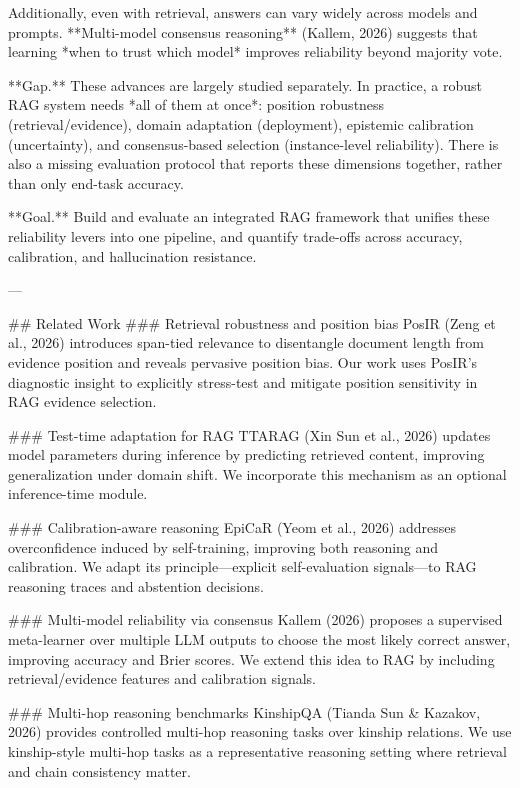Additionally, even with retrieval, answers can vary widely across models and prompts. **Multi-model consensus reasoning** (Kallem, 2026) suggests that learning *when to trust which model* improves reliability beyond majority vote.

**Gap.** These advances are largely studied separately. In practice, a robust RAG system needs *all of them at once*: position robustness (retrieval/evidence), domain adaptation (deployment), epistemic calibration (uncertainty), and consensus-based selection (instance-level reliability). There is also a missing evaluation protocol that reports these dimensions together, rather than only end-task accuracy.

**Goal.** Build and evaluate an integrated RAG framework that unifies these reliability levers into one pipeline, and quantify trade-offs across accuracy, calibration, and hallucination resistance.

---

## Related Work  
### Retrieval robustness and position bias  
PosIR (Zeng et al., 2026) introduces span-tied relevance to disentangle document length from evidence position and reveals pervasive position bias. Our work uses PosIR’s diagnostic insight to explicitly stress-test and mitigate position sensitivity in RAG evidence selection.

### Test-time adaptation for RAG  
TTARAG (Xin Sun et al., 2026) updates model parameters during inference by predicting retrieved content, improving generalization under domain shift. We incorporate this mechanism as an optional inference-time module.

### Calibration-aware reasoning  
EpiCaR (Yeom et al., 2026) addresses overconfidence induced by self-training, improving both reasoning and calibration. We adapt its principle—explicit self-evaluation signals—to RAG reasoning traces and abstention decisions.

### Multi-model reliability via consensus  
Kallem (2026) proposes a supervised meta-learner over multiple LLM outputs to choose the most likely correct answer, improving accuracy and Brier scores. We extend this idea to RAG by including retrieval/evidence features and calibration signals.

### Multi-hop reasoning benchmarks  
KinshipQA (Tianda Sun & Kazakov, 2026) provides controlled multi-hop reasoning tasks over kinship relations. We use kinship-style multi-hop tasks as a representative reasoning setting where retrieval and chain consistency matter.

